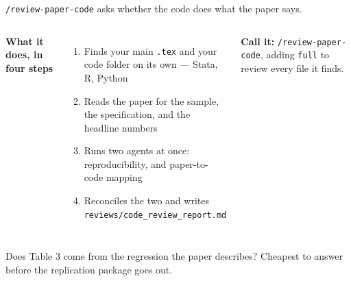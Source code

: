 \documentclass[aspectratio=169, 10pt]{beamer}
\begin{document}
\begin{frame}{\texttt{/review-paper-code} asks whether the code does what the paper says.}
\begin{columns}[t]
\textbf{What it does, in four steps}
\begin{enumerate}\small\setlength{\itemsep}{1pt}
  \item Finds your main \texttt{.tex} and your code folder on its own --- Stata, R, Python
  \item Reads the paper for the sample, the specification, and the headline numbers
  \item Runs two agents at once: reproducibility, and paper-to-code mapping
  \item Reconciles the two and writes \texttt{reviews/code\_review\_report.md}
\end{enumerate}

\vskip0.15cm
\small
\textbf{Call it:} \texttt{/review-paper-code}, adding \texttt{full} to review every file it finds.

\end{columns}

\vskip0.1cm
\begin{sowhat}
Does Table 3 come from the regression the paper describes? Cheapest to answer before the replication package goes out.
\end{sowhat}
\end{frame}
\end{document}
